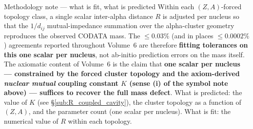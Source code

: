 \begin{resultbox}{Methodology note — what is fit, what is predicted}
Within each $(Z, A)$-forced topology class, a single scalar inter-alpha distance $R$ is adjusted per nucleus so that the $1/d_{ij}$ mutual-impedance summation over the alpha-cluster geometry reproduces the observed CODATA mass. The $\leq 0.03\%$ (and in places $\leq 0.0002\%$) agreements reported throughout Volume~6 are therefore \textbf{fitting tolerances on this one scalar per nucleus}, not ab-initio prediction errors on the mass itself. The axiomatic content of Volume~6 is the claim that \textbf{one scalar per nucleus — constrained by the forced cluster topology and the axiom-derived \emph{nuclear mutual} coupling constant $K$ (sense (i) of the symbol note above) — suffices to recover the full mass defect}. What is predicted: the value of $K$ (see \S\ref{sub:R_coupled_cavity}), the cluster topology as a function of $(Z,A)$, and the parameter count (one scalar per nucleus). What is fit: the numerical value of $R$ within each topology.
\end{resultbox}

